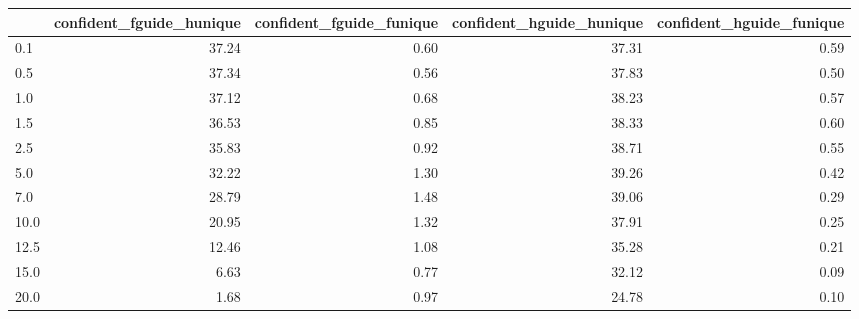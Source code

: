 \begin{tabular}{lrrrr}
\toprule
 & confident_fguide_hunique & confident_fguide_funique & confident_hguide_hunique & confident_hguide_funique \\
\midrule
0.1 & 37.24 & 0.60 & 37.31 & 0.59 \\
0.5 & 37.34 & 0.56 & 37.83 & 0.50 \\
1.0 & 37.12 & 0.68 & 38.23 & 0.57 \\
1.5 & 36.53 & 0.85 & 38.33 & 0.60 \\
2.5 & 35.83 & 0.92 & 38.71 & 0.55 \\
5.0 & 32.22 & 1.30 & 39.26 & 0.42 \\
7.0 & 28.79 & 1.48 & 39.06 & 0.29 \\
10.0 & 20.95 & 1.32 & 37.91 & 0.25 \\
12.5 & 12.46 & 1.08 & 35.28 & 0.21 \\
15.0 & 6.63 & 0.77 & 32.12 & 0.09 \\
20.0 & 1.68 & 0.97 & 24.78 & 0.10 \\
\bottomrule
\end{tabular}
